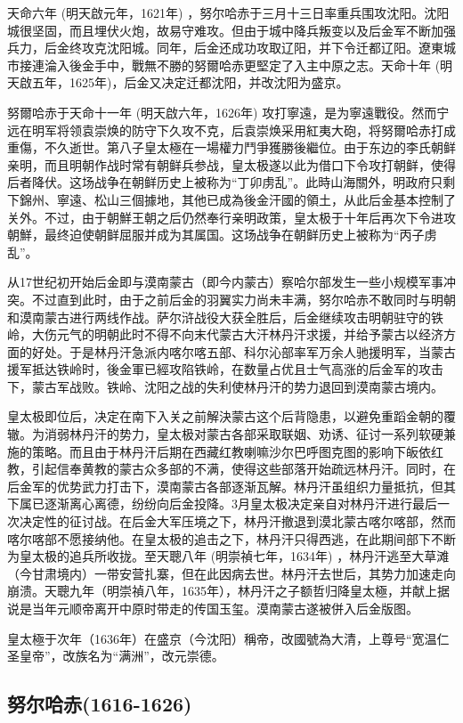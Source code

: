 天命六年 (明天啟元年，1621年) ，努尔哈赤于三月十三日率重兵围攻沈阳。沈阳城很坚固，而且埋伏火炮，故易守难攻。但由于城中降兵叛变以及后金军不断加强兵力，后金终攻克沈阳城。同年，后金还成功攻取辽阳，并下令迁都辽阳。遼東城市接連淪入後金手中，戰無不勝的努爾哈赤更堅定了入主中原之志。天命十年 (明天啟五年，1625年)，后金又决定迁都沈阳，并改沈阳为盛京。

努爾哈赤于天命十一年 (明天啟六年，1626年) 攻打寧遠，是为寧遠戰役。然而宁远在明军将领袁崇焕的防守下久攻不克，后袁崇焕采用紅夷大砲，将努爾哈赤打成重傷，不久逝世。第八子皇太極在一場權力鬥爭獲勝後繼位。由于东边的李氏朝鲜亲明，而且明朝作战时常有朝鲜兵参战，皇太极遂以此为借口下令攻打朝鲜，使得后者降伏。这场战争在朝鲜历史上被称为“丁卯虏乱”。此時山海關外，明政府只剩下錦州、寧遠、松山三個據地，其他已成為後金汗國的領土，从此后金基本控制了关外。不过，由于朝鮮王朝之后仍然奉行亲明政策，皇太极于十年后再次下令进攻朝鮮，最终迫使朝鲜屈服并成为其属国。这场战争在朝鲜历史上被称为“丙子虏乱”。

从17世纪初开始后金即与漠南蒙古（即今内蒙古）察哈尔部发生一些小规模军事冲突。不过直到此时，由于之前后金的羽翼实力尚未丰满，努尔哈赤不敢同时与明朝和漠南蒙古进行两线作战。萨尔浒战役大获全胜后，后金继续攻击明朝驻守的铁岭，大伤元气的明朝此时不得不向末代蒙古大汗林丹汗求援，并给予蒙古以经济方面的好处。于是林丹汗急派内喀尔喀五部、科尔沁部率军万余人驰援明军，当蒙古援军抵达铁岭时，後金軍已經攻陷铁岭，在数量占优且士气高涨的后金军的攻击下，蒙古军战败。铁岭、沈阳之战的失利使林丹汗的势力退回到漠南蒙古境内。

皇太极即位后，决定在南下入关之前解決蒙古这个后背隐患，以避免重蹈金朝的覆辙。为消弱林丹汗的势力，皇太极对蒙古各部采取联姻、劝诱、征讨一系列软硬兼施的策略。而且由于林丹汗后期在西藏红教喇嘛沙尔巴呼图克图的影响下皈依红教，引起信奉黄教的蒙古众多部的不满，使得这些部落开始疏远林丹汗。同时，在后金军的优势武力打击下，漠南蒙古各部逐渐瓦解。林丹汗虽组织力量抵抗，但其下属已逐渐离心离德，纷纷向后金投降。3月皇太极决定亲自对林丹汗进行最后一次决定性的征讨战。在后金大军压境之下，林丹汗撤退到漠北蒙古喀尔喀部，然而喀尔喀部不愿接纳他。在皇太极的追击之下，林丹汗只得西逃，在此期间部下不断为皇太极的追兵所收拢。至天聰八年 (明崇禎七年，1634年) ，林丹汗逃至大草滩（今甘肃境内）一带安营扎寨，但在此因病去世。林丹汗去世后，其势力加速走向崩溃。天聰九年（明崇禎八年，1635年），林丹汗之子额哲归降皇太極，并献上据说是当年元顺帝离开中原时带走的传国玉玺。漠南蒙古遂被併入后金版图。

皇太極于次年（1636年）在盛京（今沈阳）稱帝，改國號為大清，上尊号“宽温仁圣皇帝”，改族名为“满洲”，改元崇德。

\subsection{努尔哈赤\tiny(1616-1626)}

